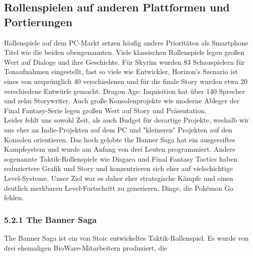 \documentclass[extern,palatino]{cgBA}
\begin{document}
\subsection{Rollenspielen auf anderen Plattformen und Portierungen}
Rollenspiele auf dem PC-Markt setzen häufig andere Prioritäten als Smartphone Titel wie die beiden obengenannten. Viele klassischen Rollenspiele legen großen Wert auf Dialoge und ihre Geschichte. Für Skyrim wurden 83 Schauspielern für Tonaufnahmen eingestellt, fast so viele wie Entwickler, Horizon's Szenario ist eines von ursprünglich 40 verschiedenen und für die finale Story wurden etwa 20 verschiedene Entwürfe gemacht. Dragon Age: Inquisition hat über 140 Sprecher und zehn Storywriter.  %
Auch große Konsolenprojekte wie moderne Ableger der Final Fantasy-Serie legen großen Wert auf Story und Präsentation.
\\Leider fehlt uns sowohl Zeit, als auch Budget für derartige Projekte, weshalb wir uns eher an Indie-Projekten auf dem PC und "kleineren" Projekten auf den Konsolen orientieren. Das hoch gelobte the Banner Saga hat ein ausgereiftes Kampfsystem und wurde am Anfang von drei Leuten programmiert. Andere sogenannte Taktik-Rollenspiele wie Disgaea und Final Fantasy Tactics haben reduziertere Grafik und Story und konzentrieren sich eher auf vielschichtige Level-Systeme. Unser Ziel war es daher eher strategische Kämpfe und einen deutlich merkbaren Level-Fortschritt zu generieren, Dinge, die Pokémon Go fehlen.
\newpage
\subsubsection{5.2.1 The Banner Saga}
The Banner Saga ist ein von Stoic entwickeltes Taktik-Rollenspiel. Es wurde von drei ehemaligen BioWare-Mitarbeitern produziert, die 
\end{document}
